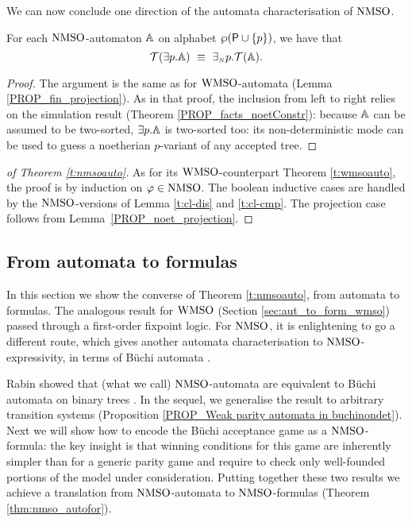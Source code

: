 We can now conclude one direction of the automata characterisation of $\mathrm{NMSO}$.

\begin{lemma}\label{PROP_noet_projection}
For each $\mathrm{NMSO}$-automaton $\mathbb{A}$ on alphabet $\wp (\mathsf{P} \cup \{p\})$,
we have that
$$\mathcal{T}({{\exists} p}.\mathbb{A}) \ \equiv\
{{\exists_{{\scriptscriptstyle N}}} p}.\mathcal{T}(\mathbb{A}).
$$
\end{lemma}
\begin{proof} The argument is the same as for $\mathrm{WMSO}$-automata (Lemma \ref{PROP_fin_projection}). As in that proof, the inclusion from left to right relies on the simulation result (Theorem \ref{PROP_facts_noetConstr}): because $\mathbb{A}$ can be assumed to be two-sorted, ${{\exists} p}.\mathbb{A}$ is two-sorted too: its non-deterministic mode can be used to guess a noetherian $p$-variant of any accepted tree. \end{proof}

\begin{proof}[of Theorem \ref{t:nmsoauto}] As for its $\mathrm{WMSO}$-counterpart Theorem \ref{t:wmsoauto}, the proof is by induction on $\varphi \in \mathrm{NMSO}$. The boolean inductive cases are handled by the $\mathrm{NMSO}$-versions of Lemma \ref{t:cl-dis} and \ref{t:cl-cmp}. The projection case follows from Lemma~\ref{PROP_noet_projection}.
\end{proof} 

\subsection{From automata to formulas} \label{sec:aut_to_formulas_nmso}

In this section we show the converse of Theorem
\ref{t:nmsoauto}, from automata to formulas. The analogous result for $\mathrm{WMSO}$ (Section \ref{sec:aut_to_form_wmso}) passed through a first-order fixpoint logic. For $\mathrm{NMSO}$, it is enlightening to go a different route, which gives another automata characterisation to $\mathrm{NMSO}$-expressivity, in terms of {B\"{u}chi automata} \cite{Rab70}. 

Rabin showed that (what we call) $\mathrm{NMSO}$-automata are equivalent to B\"{u}chi automata on binary trees \cite{Rab70}. In the sequel, we generalise the result to arbitrary transition systems (Proposition \ref{PROP_Weak parity automata in buchinondet}). Next we will show how to encode the B\"{u}chi acceptance game as a $\mathrm{NMSO}$-formula: the key insight is that winning conditions for this game are inherently simpler than for a generic parity game and require to check only well-founded portions of the model under consideration. Putting together these two results we achieve a translation from $\mathrm{NMSO}$-automata to $\mathrm{NMSO}$-formulas (Theorem \ref{thm:nmso_autofor}).

